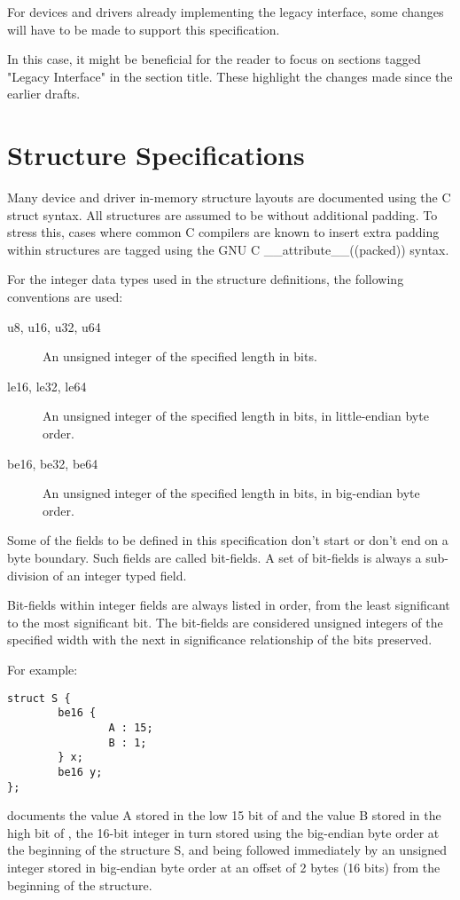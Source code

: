 For devices and drivers already implementing the legacy
interface, some changes will have to be made to support this
specification.

In this case, it might be beneficial for the reader to focus on
sections tagged "Legacy Interface" in the section title.
These highlight the changes made since the earlier drafts.

\section{Structure Specifications}\label{sec:Structure Specifications}

Many device and driver in-memory structure layouts are documented using
the C struct syntax. All structures are assumed to be without additional
padding. To stress this, cases where common C compilers are known to insert
extra padding within structures are tagged using the GNU C
__attribute__((packed))  syntax.

For the integer data types used in the structure definitions, the following
conventions are used:

\begin{description}
\item[u8, u16, u32, u64] An unsigned integer of the specified length in bits.

\item[le16, le32, le64] An unsigned integer of the specified length in bits,
in little-endian byte order.

\item[be16, be32, be64] An unsigned integer of the specified length in bits,
in big-endian byte order.
\end{description}

Some of the fields to be defined in this specification don't
start or don't end on a byte boundary. Such fields are called bit-fields.
A set of bit-fields is always a sub-division of an integer typed field.

Bit-fields within integer fields are always listed in order,
from the least significant to the most significant bit.  The
bit-fields are considered unsigned integers of the specified
width with the next in significance relationship of the bits
preserved.

For example:
\begin{lstlisting}
struct S {
        be16 {
                A : 15;
                B : 1;
        } x;
        be16 y;
};
\end{lstlisting}
documents the value A stored in the low 15 bit of  and
the value B stored in the high bit of , the 16-bit
integer  in turn stored using the big-endian byte order
at the beginning of the structure S,
and being followed immediately by an unsigned integer 
stored in big-endian byte order at an offset of 2 bytes (16 bits)
from the beginning of the structure.

